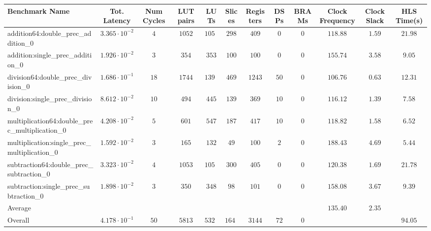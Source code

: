 \begin{tabular}{|l|c|c|c|c|c|c|c|c|c|c|c|}
\hline
Benchmark Name                                   & Tot. Latency            & Num Cycles & LUT pairs & LUTs     & Slices   & Registers & DSPs   & BRAMs & Clock Frequency & Clock Slack & HLS Time(s) \\
\hline
addition64:double\_prec\_addition\_0             & $ 3.365 \cdot 10^{-2} $ & $ 4      $ & $ 1052  $ & $ 1052 $ & $ 298  $ & $ 409   $ & $ 0  $ & $ 0 $ & $ 118.88      $ & $ 1.59    $ & $ 21.98   $ \\
addition:single\_prec\_addition\_0               & $ 1.926 \cdot 10^{-2} $ & $ 3      $ & $ 354   $ & $ 353  $ & $ 100  $ & $ 100   $ & $ 0  $ & $ 0 $ & $ 155.74      $ & $ 3.58    $ & $ 9.05    $ \\
division64:double\_prec\_division\_0             & $ 1.686 \cdot 10^{-1} $ & $ 18     $ & $ 1744  $ & $ 1392 $ & $ 469  $ & $ 1243  $ & $ 50 $ & $ 0 $ & $ 106.76      $ & $ 0.63    $ & $ 12.31   $ \\
division:single\_prec\_division\_0               & $ 8.612 \cdot 10^{-2} $ & $ 10     $ & $ 494   $ & $ 445  $ & $ 139  $ & $ 369   $ & $ 10 $ & $ 0 $ & $ 116.12      $ & $ 1.39    $ & $ 7.58    $ \\
multiplication64:double\_prec\_multiplication\_0 & $ 4.208 \cdot 10^{-2} $ & $ 5      $ & $ 601   $ & $ 547  $ & $ 187  $ & $ 417   $ & $ 10 $ & $ 0 $ & $ 118.82      $ & $ 1.58    $ & $ 6.52    $ \\
multiplication:single\_prec\_multiplication\_0   & $ 1.592 \cdot 10^{-2} $ & $ 3      $ & $ 165   $ & $ 132  $ & $ 49   $ & $ 100   $ & $ 2  $ & $ 0 $ & $ 188.43      $ & $ 4.69    $ & $ 5.44    $ \\
subtraction64:double\_prec\_subtraction\_0       & $ 3.323 \cdot 10^{-2} $ & $ 4      $ & $ 1053  $ & $ 1053 $ & $ 300  $ & $ 405   $ & $ 0  $ & $ 0 $ & $ 120.38      $ & $ 1.69    $ & $ 21.78   $ \\
subtraction:single\_prec\_subtraction\_0         & $ 1.898 \cdot 10^{-2} $ & $ 3      $ & $ 350   $ & $ 348  $ & $ 98   $ & $ 101   $ & $ 0  $ & $ 0 $ & $ 158.08      $ & $ 3.67    $ & $ 9.39    $ \\
\hline
Average                                          & $                     $ & $        $ & $       $ & $      $ & $      $ & $       $ & $    $ & $   $ & $ 135.40      $ & $ 2.35    $ & $         $ \\
\hline
Overall                                          & $ 4.178 \cdot 10^{-1} $ & $ 50     $ & $ 5813  $ & $ 5322 $ & $ 1640 $ & $ 3144  $ & $ 72 $ & $ 0 $ & $             $ & $         $ & $ 94.05   $ \\
\hline
\end{tabular}
